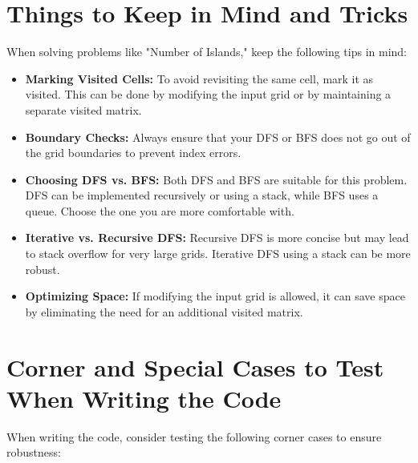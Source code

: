 \section*{Things to Keep in Mind and Tricks}
    
When solving problems like "Number of Islands," keep the following tips in mind:
    
\begin{itemize}
    \item \textbf{Marking Visited Cells:} To avoid revisiting the same cell, mark it as visited. This can be done by modifying the input grid or by maintaining a separate visited matrix.
    
    \item \textbf{Boundary Checks:} Always ensure that your DFS or BFS does not go out of the grid boundaries to prevent index errors.
    
    \item \textbf{Choosing DFS vs. BFS:} Both DFS and BFS are suitable for this problem. DFS can be implemented recursively or using a stack, while BFS uses a queue. Choose the one you are more comfortable with.
    
    \item \textbf{Iterative vs. Recursive DFS:} Recursive DFS is more concise but may lead to stack overflow for very large grids. Iterative DFS using a stack can be more robust.
    
    \item \textbf{Optimizing Space:} If modifying the input grid is allowed, it can save space by eliminating the need for an additional visited matrix.
\end{itemize}
    
\section*{Corner and Special Cases to Test When Writing the Code}
    
When writing the code, consider testing the following corner cases to ensure robustness:
    

